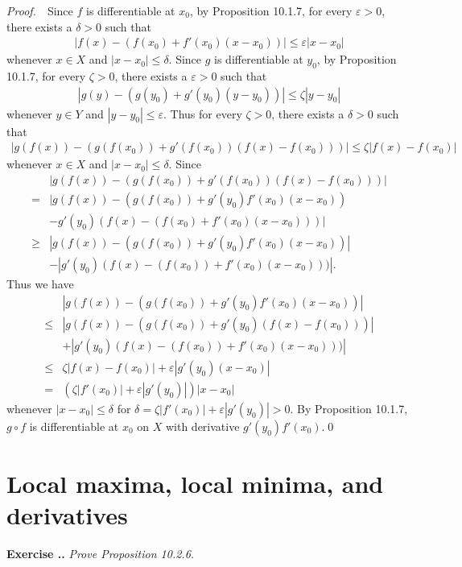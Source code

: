 \documentclass{book}
\newcommand{\pff}{\vspace{.25em}\noindent\emph{Proof.}~~}
\newcounter{Exercise}[section]
\renewcommand{\theExercise}{\thesection.\arabic{Exercise}.}
\newcommand{\new}{\vspace{1.5em}\noindent\textbf{{Exercise \stepcounter{Exercise}\textbf{\theExercise}}} }
\begin{document}
\pff Since $f$ is differentiable at $x_0$, by Proposition 10.1.7, for every $\varepsilon>0$, there exists a $\delta>0$ such that
    \begin{align*}
        |f(x)-(f(x_0)+f'(x_0)(x-x_0))|\leq\varepsilon|x-x_0|
    \end{align*}
whenever $x\in X$ and $|x-x_0|\leq\delta$. Since $g$ is differentiable at $y_0$, by Proposition 10.1.7, for every $\zeta>0$, there exists a $\varepsilon>0$ such that
    \begin{align*}
        |g(y)-(g(y_0)+g'(y_0)(y-y_0))|\leq\zeta|y-y_0|
    \end{align*}
whenever $y\in Y$ and $|y-y_0|\leq\varepsilon$. Thus for every $\zeta>0$, there exists a $\delta>0$ such that
    \begin{align*}
        |g(f(x))-(g(f(x_0))+g'(f(x_0))(f(x)-f(x_0)))|\leq\zeta|f(x)-f(x_0)|
    \end{align*}
whenever $x\in X$ and $|x-x_0|\leq\delta$. Since
    \begin{align*}
        &|g(f(x))-(g(f(x_0))+g'(f(x_0))(f(x)-f(x_0)))|\\
        =&|g(f(x))-(g(f(x_0))+g'(y_0)f'(x_0)(x-x_0))\\
        &-g'(y_0)(f(x)-(f(x_0)+f'(x_0)(x-x_0)))|\\
        \geq&|g(f(x))-(g(f(x_0))+g'(y_0)f'(x_0)(x-x_0))|\\
        &-|g'(y_0)(f(x)-(f(x_0))+f'(x_0)(x-x_0)))|.
    \end{align*}
Thus we have
    \begin{align*}
        &|g(f(x))-(g(f(x_0))+g'(y_0)f'(x_0)(x-x_0))|\\
        \leq&|g(f(x))-(g(f(x_0))+g'(y_0)(f(x)-f(x_0)))|\\
        &+|g'(y_0)(f(x)-(f(x_0))+f'(x_0)(x-x_0)))|\\
        \leq&\zeta|f(x)-f(x_0)|+\varepsilon|g'(y_0)(x-x_0)|\\
        =&(\zeta|f'(x_0)|+\varepsilon|g'(y_0)|)|x-x_0|
    \end{align*}
whenever $|x-x_0|\leq\delta$ for $\delta=\zeta|f'(x_0)|+\varepsilon|g'(y_0)|>0$. By Proposition 10.1.7, $g\circ f$ is differentiable at $x_0$ on $X$ with derivative $g'(y_0)f'(x_0)$.\qed

\section{Local maxima, local minima, and derivatives}

\new\emph{Prove Proposition 10.2.6.}
\end{document}
